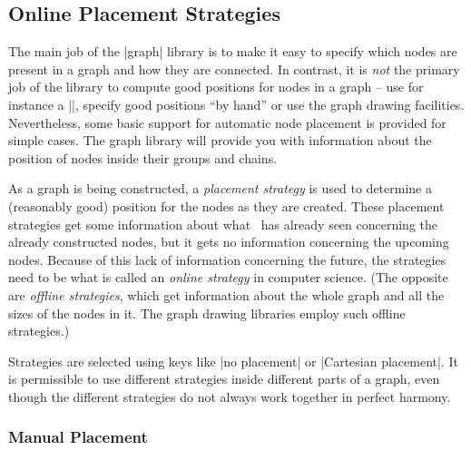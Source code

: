 \subsection{Online Placement Strategies}
\label{section-library-graphs-placement}

The main job of the |graph| library is to make it easy to specify
which nodes are present in a graph and how they are connected. In
contrast, it is \emph{not} the primary job of the library to compute
good positions for nodes in a graph -- use for instance a |\matrix|,
specify good positions ``by hand'' or use the graph drawing
facilities. Nevertheless, some basic support for automatic node
placement is provided for simple cases. The graph library will provide
you with information about the position of nodes inside their groups
and chains. 

As a graph is being constructed, a \emph{placement strategy} is used
to determine a (reasonably good) position for the nodes as they are
created. These placement strategies get some information about what
\tikzname\ has already seen concerning the already constructed nodes,
but it gets no information concerning the upcoming nodes. Because of
this lack of information concerning the future, the strategies need to
be what is called an \emph{online strategy} in computer science. (The
opposite are \emph{offline strategies}, which get information about
the whole graph and all the sizes of the nodes in it. The graph
drawing libraries employ such offline strategies.)

Strategies are selected using keys like |no placement| or
|Cartesian placement|. It is permissible to use different strategies inside
different parts of a graph, even though the different strategies do
not always work together in perfect harmony.


\subsubsection{Manual Placement}
\label{section-graphs-xy}

